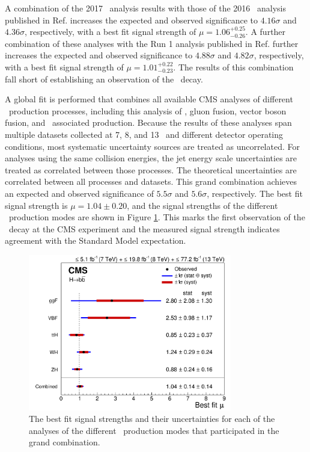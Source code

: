 A combination of the 2017 \VHbb\ analysis results with those of the 2016 \VHbb\ analysis published in Ref. \cite{CMSVHbbEvidence} increases the expected and observed significance to $4.16\sigma$ and $4.36\sigma$, respectively, with a best fit signal strength of $\mu = 1.06_{-0.26}^{+0.25}$. A further combination of these analyses with the Run 1 analysis published in Ref. \cite{CMSVHbbRun1} further increases the expected and observed significance to $4.88\sigma$ and $4.82\sigma$, respectively, with a best fit signal strength of $\mu = 1.01_{-0.23}^{+0.22}$. The results of this combination fall short of establishing an observation of the \VHbb\ decay.

A global fit is performed that combines all available CMS analyses of different \Htobb\ production processes, including this analysis of \VHbb, gluon fusion\cite{ggHbb}, vector boson fusion\cite{VBF}, and \qrkt\qrktbar\ associated production\cite{CMSttH1,CMSttH2,CMSttH3}. Because the results of these analyses span multiple datasets collected at 7, 8, and 13 \TeV\ and different detector operating conditions, most systematic uncertainty sources are treated as uncorrelated. For analyses using the same collision energies, the jet energy scale uncertainties are treated as correlated between those processes. The theoretical uncertainties are correlated between all processes and datasets. This grand combination achieves an expected and observed significance of $5.5\sigma$ and $5.6\sigma$, respectively. The best fit signal strength is $\mu = 1.04 \pm 0.20$, and the signal strengths of the different \Htobb\ production modes are shown in Figure \ref{fig:MuHbb}. This marks the first observation of the \Htobb\ decay at the CMS experiment and the measured signal strength indicates agreement with the Standard Model expectation.

\begin{figure}[htbp]
  \centering
    \includegraphics[width=3.5in]{images/CMS-HIG-18-016_Figure_003}
    \caption[\Hbb\ Combination Signal Strengths]{The best fit signal strengths and their uncertainties for each of the analyses of the different \Htobb\ production modes that participated in the grand combination.}
    \label{fig:MuHbb}
\end{figure}


